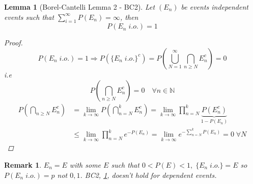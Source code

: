 \documentclass[12pt]{article}
\def\NN{\mathbb{N}}
\newtheorem{lemma}[theorem]{Lemma}
\newtheorem*{remark}{Remark}
\begin{document}
\begin{lemma}[Borel-Cantelli Lemma 2 - BC2]\label{bc2}
Let $(E_n)$ be events independent events such that $\sum\limits_{i=1}^{\infty}P(E_n) =\infty$, then 
\[P(E_n \; i.o.) = 1\]
\begin{proof}
\[P(E_n \; i.o.) = 1 \Rightarrow P(\{E_n \; i.o.\}^c) = P( \bigcup_{N=1}^{\infty}\bigcap_{n \geq N}E_n^c)=0\]
i.e\[P(\bigcap_{n \geq N}E_n^c) =0 \quad \forall n \in \NN\]
\begin{align*}
P(\bigcap_{n \geq N}E_n^c) &= \lim_{k\rightarrow \infty}P(\bigcap\limits_{n =N}^{k}E_n^c) = \lim_{k\rightarrow \infty}\prod_{n =N}^{k}\underbrace{P(E_n^c)}_{1-P(E_n)}\\
&\leq  \lim_{k\rightarrow \infty}\prod_{n =N}^{k}e^{-P(E_n)}= \lim_{k\rightarrow \infty}e^{-\sum_{n=N}^{k}P(E_n)} =0 \; \forall N \end{align*}
\end{proof}
\end{lemma}

\begin{remark}
$E_n = E$ with some $E$ such that $0<P(E)<1, \; \{E_n \;i.o.\} = E$ so $P(E_n \; i.o.) = p$ not $0,1$. BC2, \ref{bc2}, doesn't hold for dependent events. \end{remark}
\end{document}
